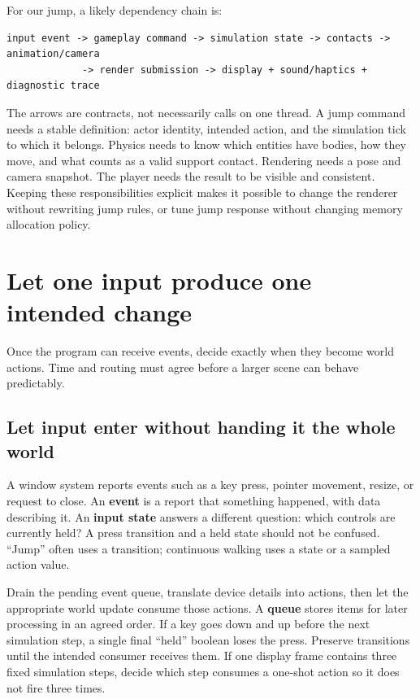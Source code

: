 For our jump, a likely dependency chain is:

\begin{verbatim}
input event -> gameplay command -> simulation state -> contacts -> animation/camera
             -> render submission -> display + sound/haptics + diagnostic trace
\end{verbatim}

The arrows are contracts, not necessarily calls on one thread. A jump command needs a stable definition: actor identity, intended action, and the simulation tick to which it belongs. Physics needs to know which entities have bodies, how they move, and what counts as a valid support contact. Rendering needs a pose and camera snapshot. The player needs the result to be visible and consistent. Keeping these responsibilities explicit makes it possible to change the renderer without rewriting jump rules, or tune jump response without changing memory allocation policy.

\section{Let one input produce one intended change}\label{05-engine-i-ch013-let-one-input-produce-one-intended-change}

Once the program can receive events, decide exactly when they become world actions. Time and routing must agree before a larger scene can behave predictably.

\subsection{Let input enter without handing it the whole world}\label{05-engine-i-ch013-let-input-enter-without-handing-it-the-whole-world}

A window system reports events such as a key press, pointer movement, resize, or request to close. An \textbf{event} is a report that something happened, with data describing it. An \textbf{input state} answers a different question: which controls are currently held? A press transition and a held state should not be confused. ``Jump'' often uses a transition; continuous walking uses a state or a sampled action value.

Drain the pending event queue, translate device details into actions, then let the appropriate world update consume those actions. A \textbf{queue} stores items for later processing in an agreed order. If a key goes down and up before the next simulation step, a single final ``held'' boolean loses the press. Preserve transitions until the intended consumer receives them. If one display frame contains three fixed simulation steps, decide which step consumes a one-shot action so it does not fire three times.

